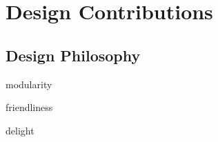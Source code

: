 \chapter{Design Contributions}

\section{Design Philosophy}\label{design-philosophy}

modularity

friendliness

delight
